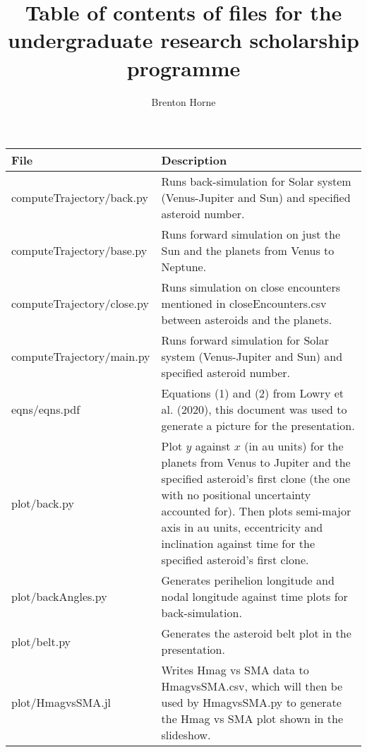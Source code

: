 \documentclass[12pt,a4paper]{article}
\title{Table of contents of files for the undergraduate research scholarship programme}
\author{Brenton Horne}
\begin{document}
\maketitle

\begin{tabular}{|m{15em}|m{30em}|}
    \hline
    File & Description \\\hline
    computeTrajectory/back.py & Runs back-simulation for Solar system (Venus-Jupiter and Sun) and specified asteroid number. \\\hline
    computeTrajectory/base.py & Runs forward simulation on just the Sun and the planets from Venus to Neptune. \\\hline
    computeTrajectory/close.py & Runs simulation on close encounters mentioned in closeEncounters.csv between asteroids and the planets. \\\hline
    computeTrajectory/main.py & Runs forward simulation for Solar system (Venus-Jupiter and Sun) and specified asteroid number. \\\hline
    eqns/eqns.pdf & Equations (1) and (2) from Lowry et al. (2020), this document was used to generate a picture for the presentation. \\\hline
    plot/back.py & Plot $y$ against $x$ (in au units) for the planets from Venus to Jupiter and the specified asteroid's first clone (the one with no positional uncertainty accounted for). Then plots semi-major axis in au units, eccentricity and inclination against time for the specified asteroid's first clone. \\\hline
    plot/backAngles.py & Generates perihelion longitude and nodal longitude against time plots for back-simulation. \\\hline
    plot/belt.py & Generates the asteroid belt plot in the presentation. \\\hline
    plot/HmagvsSMA.jl & Writes Hmag vs SMA data to HmagvsSMA.csv, which will then be used by HmagvsSMA.py to generate the Hmag vs SMA plot shown in the slideshow. 
\end{tabular}
\end{document}
